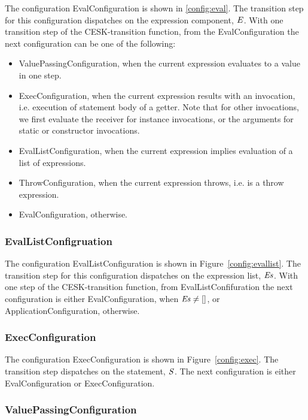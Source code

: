 \documentclass{article}
\begin{document}
The configuration EvalConfiguration is shown in \ref{config:eval}. 
The transition step for this configuration dispatches on the expression component, $\mathit{E}$.
With one transition step of the CESK-transition function, from the EvalConfiguration the next configuration can be one of the following:
\begin{itemize}
\item ValuePassingConfiguration, when the current expression evaluates to a value in one step.
\item ExecConfiguration, when the current expression results with an invocation, i.e. execution of statement body of a getter.
Note that for other invocations, we first evaluate the receiver for instance invocations, or the arguments for static or constructor invocations.
\item EvalListConfiguration, when the current expression implies evaluation of a list of expressions.
\item ThrowConfiguration, when the current expression throws, i.e. is a throw expression.
\item EvalConfiguration, otherwise.
\end{itemize}

\subsubsection{EvalListConfigruation}
\label{subsubsec:evallistconfig}
The configuration EvalListConfiguration is shown in Figure~\ref{config:evallist}.
The transition step for this configuration dispatches on the expression list, $\mathit{E}\mathit{s}$.
With one step of the CESK-transition function, from EvalListConfifuration the next configuration is either EvalConfiguration, when $\mathit{E}\mathit{s} \neq []$, or ApplicationConfiguration, otherwise.

\subsubsection{ExecConfiguration}
\label{subsubsec:execconfig}

The configuration ExecConfiguration is shown in Figure~\ref{config:exec}.
The transition step dispatches on the statement, $\mathit{S}$.
The next configuration is either EvalConfiguration or ExecConfiguration.

\subsubsection{ValuePassingConfiguration}
\label{suubsubsec:valuepassingconfig}
\end{document}
